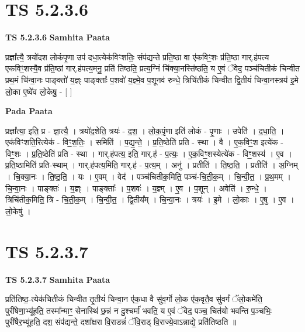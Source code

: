 \documentclass[17pt]{extarticle}
\begin{document}
\section*{ TS 5.2.3.6 }

\textbf{TS 5.2.3.6 } \newline
\textbf{Samhita Paata} \newline

प्रज्ञा᳚त्यै॒ त्रयो॑दश लोकंपृ॒णा उप॑ दधा॒त्येक॑विꣳशतिः॒ संप॑द्यन्ते प्रति॒ष्ठा वा ए॑कविꣳ॒॒शः प्र॑ति॒ष्ठा गार्.ह॑पत्य एकविꣳ॒॒शस्यै॒व प्र॑ति॒ष्ठां गार्.ह॑पत्य॒मनु॒ प्रति॑ तिष्ठति॒ प्रत्य॒ग्निं चि॑क्या॒नस्ति॑ष्ठति॒ य ए॒वं ॅवेद॒ पञ्च॑चितीकं चिन्वीत प्रथ॒मं चि॑न्वा॒नः पाङ्क्तो॑ य॒ज्ञ्ः पाङ्क्ताः᳚ प॒शवो॑ य॒ज्ञ्मे॒व प॒शूनव॑ रुन्धे॒ त्रिचि॑तीकं चिन्वीत द्वि॒तीयं॑ चिन्वा॒नस्त्रय॑ इ॒मे लो॒का ए॒ष्वे॑व लो॒केषु॒ - [  ] \newline

\textbf{Pada Paata} \newline

प्रज्ञा᳚त्या॒ इति॒ प्र - ज्ञा॒त्यै॒ । त्रयो॑द॒शेति॒ त्रयः॑ - द॒श॒ । लो॒क॒पृं॒णा इति॑ लोकं - पृ॒णाः । उपेति॑ । द॒धा॒ति॒ । एक॑विꣳशति॒रित्येक॑ - विꣳ॒॒श॒तिः॒ । समिति॑ । प॒द्य॒न्ते॒ । प्र॒ति॒ष्ठेति॑ प्रति - स्था । वै । ए॒क॒विꣳ॒॒श इत्ये॑क - विꣳ॒॒शः । प्र॒ति॒ष्ठेति॑ प्रति - स्था । गार्.ह॑पत्य॒ इति॒ गार्.ह॑ - प॒त्यः॒ । ए॒क॒विꣳ॒॒शस्येत्ये॑क - विꣳ॒॒शस्य॑ । ए॒व । प्र॒ति॒ष्ठामिति॑ प्रति-स्थाम् । गार्.ह॑पत्य॒मिति॒ गार्.ह॑ - प॒त्य॒म् । अनु॑ । प्रतीति॑ । ति॒ष्ठ॒ति॒ । प्रतीति॑ । अ॒ग्निम् । चि॒क्या॒नः । ति॒ष्ठ॒ति॒ । यः । ए॒वम् । वेद॑ । पञ्च॑चितीक॒मिति॒ पञ्च॑-चि॒ती॒क॒म् । चि॒न्वी॒त॒ । प्र॒थ॒मम् । चि॒न्वा॒नः । पाङ्क्तः॑ । य॒ज्ञ्ः । पाङ्क्ताः᳚ । प॒शवः॑ । य॒ज्ञ्म् । ए॒व । प॒शून् । अवेति॑ । रु॒न्धे॒ । त्रिचि॑तीक॒मिति॒ त्रि - चि॒ती॒क॒म् । चि॒न्वी॒त॒ । द्वि॒तीय᳚म् । चि॒न्वा॒नः । त्रयः॑ । इ॒मे । लो॒काः । ए॒षु । ए॒व । लो॒केषु॑ ।  \newline




\section*{ TS 5.2.3.7 }

\textbf{TS 5.2.3.7 } \newline
\textbf{Samhita Paata} \newline

प्रति॑तिष्ठ॒-त्येक॑चितीकं चिन्वीत तृ॒तीयं॑ चिन्वा॒न ए॑क॒धा वै सु॑व॒र्गो लो॒क ए॑क॒वृतै॒व सु॑वर्गं ॅलो॒कमे॑ति॒ पुरी॑षेणा॒भ्यू॑हति॒ तस्मा᳚न्माꣳ॒॒ सेनास्थि॑ छ॒न्नं न दु॒श्चर्मा॑ भवति॒ य ए॒वं ॅवेद॒ पञ्च॒ चित॑यो भवन्ति प॒ञ्चभिः॒ पुरी॑षैर॒भ्यू॑हति॒ दश॒ संप॑द्यन्ते॒ दशा᳚क्षरा वि॒राडन्नं॑ ॅवि॒राड् वि॒राज्ये॒वाऽन्नाद्ये॒ प्रति॑तिष्ठति ॥ \newline
\end{document}
